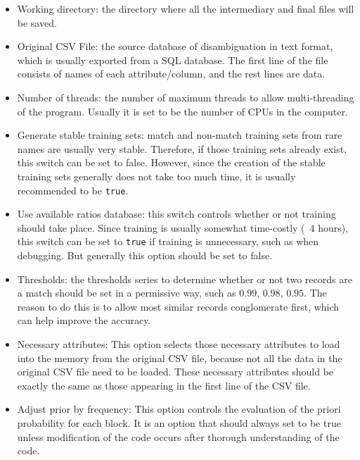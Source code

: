 \documentclass{article}
\begin{document}
\begin{itemize}

\item Working directory: the directory where all the intermediary 
and final files will be saved.

\item Original CSV File: the source database of disambiguation in 
text format, which is usually exported from a SQL database. 
The first line of the file consists of names of each
attribute/column, and the rest lines are data.

\item Number of threads: the number of maximum threads to 
allow multi-threading of the program. Usually it is set to 
be the number of CPUs in the computer.

\item  Generate stable training sets: match and non-match 
training sets from rare names are usually very stable. Therefore, 
if those training sets already exist, this switch can be set 
to false. However, since the creation of the stable 
training sets generally does not take too much time,
it is usually recommended to be \texttt{true}.


\item Use available ratios database: this switch controls 
whether or not training should take place. Since training is 
usually somewhat time-costly (~4 hours), this switch can be 
set to \texttt{true} if training is unnecessary, such as 
when debugging. But generally this option should be set to false.

\item Thresholds: the thresholds series to determine whether 
or not two records are a match should be set in a permissive way, 
such as $0.99$, $0.98$, $0.95$. The reason to do this is to allow most
similar records conglomerate first, which can help improve the accuracy.

\item Necessary attributes: This option selects those necessary 
attributes to load into the memory from the original CSV file, 
because not all the data in the original CSV file need to be loaded.
These necessary attributes should be exactly the same as those 
appearing in the first line of the CSV file.

\item Adjust prior by frequency: This option controls the evaluation 
of the priori probability for each block. It is an option that 
should always set to be true unless modification of the code
occurs after thorough understanding of the code.


\end{itemize}
\end{document}
